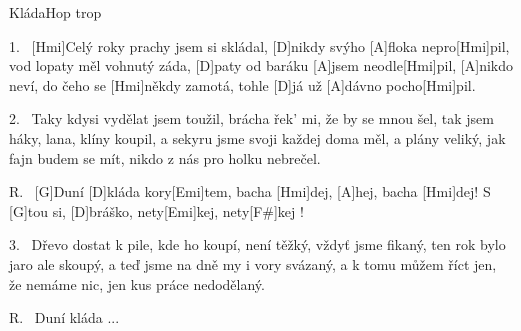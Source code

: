 \begin{song}{Kláda}{Hop trop}

\begin{xverse}{1.~}
[Hmi]Celý roky prachy jsem si skládal,
[D]nikdy svýho [A]floka nepro[Hmi]pil,
vod lopaty měl vohnutý záda,
[D]paty od baráku [A]jsem neodle[Hmi]pil,
[A]nikdo neví, do čeho se [Hmi]někdy zamotá,
tohle [D]já už [A]dávno pocho[Hmi]pil.
\end{xverse}


\begin{xverse}{2.~}
Taky kdysi vydělat jsem toužil,
brácha řek' mi, že by se mnou šel,
tak jsem háky, lana, klíny koupil,
a sekyru jsme svoji každej doma měl,
a plány veliký, jak fajn budem se mít,
nikdo z nás pro holku nebrečel.
\end{xverse}


\begin{xverse}{R.~}
[G]Duní [D]kláda kory[Emi]tem, bacha [Hmi]dej, [A]hej, bacha [Hmi]dej!
S [G]tou si, [D]bráško, nety[Emi]kej, nety[F#]kej !
\end{xverse}


\begin{xverse}{3.~}
Dřevo dostat k pile, kde ho koupí,
není těžký, vždyť jsme fikaný,
ten rok bylo jaro ale skoupý,
a teď jsme na dně my i vory svázaný,
a k tomu můžem říct jen, že nemáme nic,
jen kus práce nedodělaný.
\end{xverse}


\begin{xverse}{R.~}
Duní kláda ...
\end{xverse}
\end{song}

